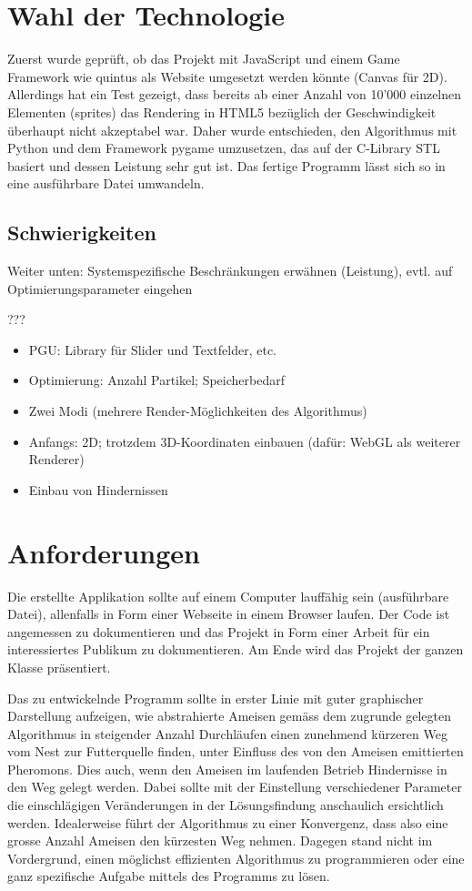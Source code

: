 \section{Wahl der Technologie}

Zuerst wurde geprüft, ob das Projekt mit JavaScript und einem Game Framework wie quintus als Website umgesetzt werden könnte (Canvas für 2D). Allerdings hat ein Test gezeigt, dass bereits ab einer Anzahl von 10'000 einzelnen Elementen (sprites) das Rendering in HTML5 bezüglich der Geschwindigkeit überhaupt nicht akzeptabel war. Daher wurde entschieden, den Algorithmus mit Python und dem Framework pygame umzusetzen, das auf der C-Library STL basiert und dessen Leistung sehr gut ist. Das fertige Programm lässt sich so in eine ausführbare Datei umwandeln.

\subsection{Schwierigkeiten}

Weiter unten: Systemspezifische Beschränkungen erwähnen (Leistung), evtl. auf Optimierungsparameter eingehen

???
\begin{itemize}[noitemsep]
\item PGU: Library für Slider und Textfelder, etc.
\item Optimierung: Anzahl Partikel; Speicherbedarf
\item Zwei Modi (mehrere Render-Möglichkeiten des Algorithmus)
\item Anfangs: 2D; trotzdem 3D-Koordinaten einbauen (dafür: WebGL als weiterer Renderer)
\item Einbau von Hindernissen
\end{itemize}




\section{Anforderungen}

Die erstellte Applikation sollte auf einem Computer lauffähig sein (ausführbare Datei), allenfalls in Form einer Webseite in einem Browser laufen. Der Code ist angemessen zu dokumentieren und das Projekt in Form einer Arbeit für ein interessiertes Publikum zu dokumentieren. Am Ende wird das Projekt der ganzen Klasse präsentiert.

Das zu entwickelnde Programm sollte in erster Linie mit guter graphischer Darstellung aufzeigen, wie abstrahierte Ameisen gemäss dem zugrunde gelegten Algorithmus in steigender Anzahl Durchläufen einen zunehmend kürzeren Weg vom Nest zur Futterquelle finden, unter Einfluss des von den Ameisen emittierten Pheromons. Dies auch, wenn den Ameisen im laufenden Betrieb Hindernisse in den Weg gelegt werden. Dabei sollte mit der Einstellung verschiedener Parameter die einschlägigen Veränderungen in der Lösungsfindung anschaulich ersichtlich werden. Idealerweise führt der Algorithmus zu einer Konvergenz, dass also eine grosse Anzahl Ameisen den kürzesten Weg nehmen. Dagegen stand nicht im Vordergrund, einen möglichst effizienten Algorithmus zu programmieren oder eine ganz spezifische Aufgabe mittels des Programms zu lösen.


